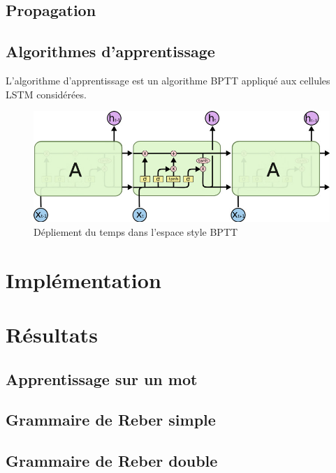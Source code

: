 \subsection{Propagation}

\subsection{Algorithmes d'apprentissage}
L'algorithme d'apprentissage est un algorithme BPTT appliqué aux cellules
LSTM considérées.

\begin{figure}[!ht]
\begin{center}
\includegraphics[scale=0.4]{images/lstm-bptt.png}
\end{center}
\caption{Dépliement du temps dans l'espace style BPTT}
\end{figure}

\section{Implémentation}

\section{Résultats}
\subsection{Apprentissage sur un mot}
\subsection{Grammaire de Reber simple}
\subsection{Grammaire de Reber double}
